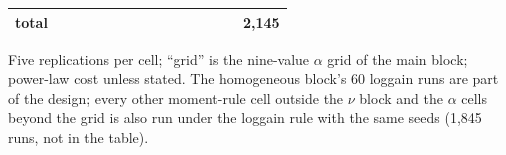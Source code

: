 \begin{table}[htbp]
\begin{tabular}{lp{0.36\linewidth}p{0.12\linewidth}p{0.17\linewidth}r}
\midrule
total &  &  &  & 2,145 \\
\bottomrule
\end{tabular}
\par\smallskip\begin{minipage}{0.95\linewidth}\footnotesize Five replications per cell; ``grid'' is the nine-value $\alpha$ grid of the main block; power-law cost unless stated. The homogeneous block's 60 loggain runs are part of the design; every other moment-rule cell outside the $\nu$ block and the $\alpha$ cells beyond the grid is also run under the loggain rule with the same seeds (1,845 runs, not in the table).\end{minipage}
\end{table}
